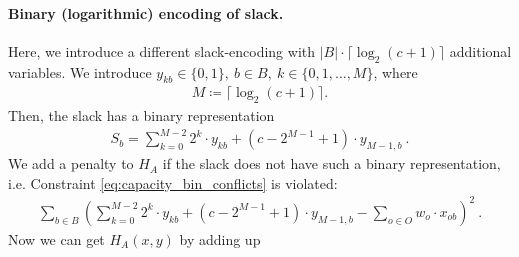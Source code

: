 \paragraph{Binary (logarithmic) encoding of slack.}
Here, we introduce a different slack-encoding with $|B| \cdot \lceil \log_2(c+1) \rceil$ additional variables.
We introduce $y_{kb}\in \{0,1\},\ b\in B,\ k \in \{0,1,\dots,M\}$, where
\begin{align}
	M\coloneqq \lceil \log_2(c+1) \rceil .
\end{align}
Then, the slack has a binary representation
\begin{align}
	S_b = \sum_{k=0}^{M-2}2^k\cdot y_{kb} + (c  - 2^{M-1} + 1)\cdot y_{M-1,b}\ .
\end{align}
We add a  penalty to $H_A$ if the slack does not have such a binary representation, i.e. Constraint \eqref{eq:capacity_bin_conflicts} is violated:
\begin{align}
	\sum_{b \in B} \left(\sum_{k=0}^{M-2}2^k\cdot y_{kb} + (c  - 2^{M-1} + 1)\cdot y_{M-1,b} - \sum_{ o \in O}w_o\cdot x_{ob} \right)^2\ .
\end{align}
Now we can get $H_A(x,y)$ by adding up 

